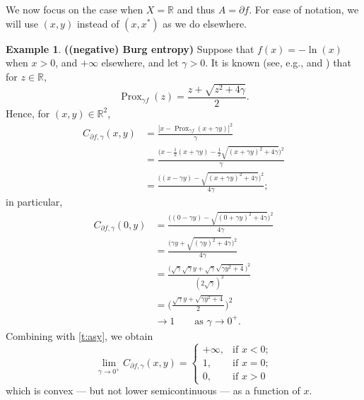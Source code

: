 \documentclass[12pt]{article}
\newcommand{\RR}{\ensuremath{\mathbb R}}
\newcommand{\prox}{\ensuremath{\operatorname{Prox}}}
\newcommand{\pinf}{\ensuremath{+\infty}}
\theoremstyle{definition}
\newtheorem{example}[theorem]{Example}
\providecommand{\RR}{\mathbb{R}}
\providecommand{\RR}{\mathbb{R}}
\begin{document}
{We now focus on the case when $X=\RR$
and thus $A=\partial f$. 
For ease of notation, we will use $(x,y)$ instead of $(x,x^*)$
as we do elsewhere. 

\begin{example} {\bf ((negative) Burg entropy)} 
Suppose that $f(x) = -\ln(x)$ when $x>0$, and $\pinf$ elsewhere, 
and let $\gamma>0$. 
It is known 
(see, e.g., \cite[Example~6.9]{Beck2} and \cite[Example~24.40]{BC2017}) 
that for $z\in\RR$, 
\begin{equation}
\prox_{\gamma f}(z) = \frac{z+\sqrt{z^2+4\gamma}}{2}. 
\end{equation}
Hence, for $(x,y)\in\RR^2$, 
\begin{subequations}
\begin{align}
C_{\partial f,\gamma}(x,y)
&= 
\frac{|x-\prox_{\gamma f}(x+\gamma y)|^2}{\gamma}\\
&= \frac{\big(x-\tfrac{1}{2}(x+\gamma y)-\tfrac{1}{2}\sqrt{(x+\gamma y)^2+4\gamma}\big)^2}{\gamma}\\
&= 
\frac{\big((x-\gamma y)-\sqrt{(x+\gamma y)^2+4\gamma}\big)^2}{4\gamma};
\end{align}
\end{subequations}
in particular, 
\begin{subequations}
\label{e:220517b}
\begin{align}
C_{\partial f,\gamma}(0,y)
&= 
\frac{\big((0-\gamma y)-\sqrt{(0+\gamma y)^2+4\gamma}\big)^2}{4\gamma}\\
&= 
\frac{\big(\gamma y+\sqrt{(\gamma y)^2+4\gamma}\big)^2}{4\gamma}\\
&= 
\frac{\big(\sqrt{\gamma}\sqrt{\gamma}y+\sqrt{\gamma}\sqrt{\gamma y^2+4}\big)^2}{(2\sqrt{\gamma})^2}\\
&=\bigg(\frac{\sqrt{\gamma}y + \sqrt{\gamma y^2+4}}{2}\bigg)^2\\
&\to 1 \qquad\text{as $\gamma\to 0^+$.}
\end{align}
\end{subequations}
Combining with \cref{t:asy}, we obtain
\begin{equation}
\lim_{\gamma\to 0^+} C_{\partial f,\gamma}(x,y) = 
\begin{cases}
+\infty, &\text{if $x<0$;}\\
1, &\text{if $x=0$;}\\
0, &\text{if $x>0$}
\end{cases}
\end{equation}
which is convex --- but not lower semicontinuous --- as a function of $x$. 
\end{example}




}
\end{document}
